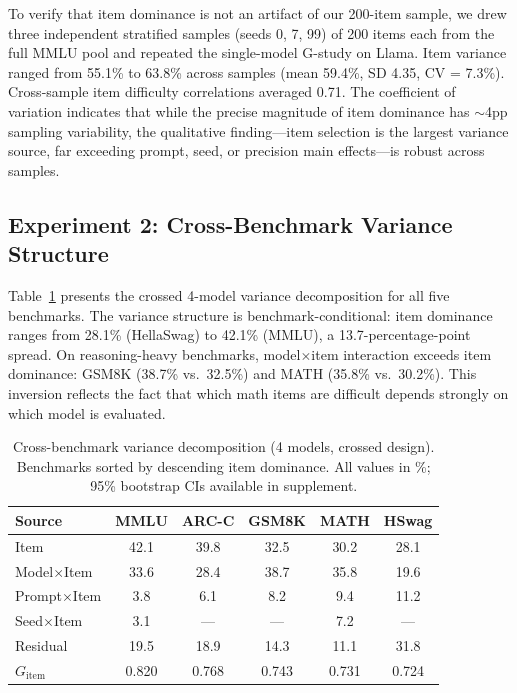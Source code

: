 \documentclass[11pt,letterpaper]{article}
\begin{document}
To verify that item dominance is not an artifact of our 200-item sample, we drew three independent stratified samples (seeds 0, 7, 99) of 200 items each from the full MMLU pool and repeated the single-model G-study on Llama. Item variance ranged from 55.1\% to 63.8\% across samples (mean 59.4\%, SD 4.35, CV = 7.3\%). Cross-sample item difficulty correlations averaged 0.71. The coefficient of variation indicates that while the precise magnitude of item dominance has $\sim$4pp sampling variability, the qualitative finding---item selection is the largest variance source, far exceeding prompt, seed, or precision main effects---is robust across samples.

\subsection{Experiment 2: Cross-Benchmark Variance Structure}
\label{sec:cross_bench}

Table~\ref{tab:cross_benchmark} presents the crossed 4-model variance decomposition for all five benchmarks. The variance structure is benchmark-conditional: item dominance ranges from 28.1\% (HellaSwag) to 42.1\% (MMLU), a 13.7-percentage-point spread. On reasoning-heavy benchmarks, model$\times$item interaction exceeds item dominance: GSM8K (38.7\% vs.\ 32.5\%) and MATH (35.8\% vs.\ 30.2\%). This inversion reflects the fact that which math items are difficult depends strongly on which model is evaluated.

\begin{table}[t]
\centering
\caption{Cross-benchmark variance decomposition (4 models, crossed design). Benchmarks sorted by descending item dominance. All values in \%; 95\% bootstrap CIs available in supplement.}
\label{tab:cross_benchmark}
\small
\begin{tabular}{l@{\hskip 6pt}c@{\hskip 6pt}c@{\hskip 6pt}c@{\hskip 6pt}c@{\hskip 6pt}c}
\toprule
\textbf{Source} & \textbf{MMLU} & \textbf{ARC-C} & \textbf{GSM8K} & \textbf{MATH} & \textbf{HSwag} \\
\midrule
Item         & 42.1 & 39.8 & 32.5 & 30.2 & 28.1 \\
Model$\times$Item & 33.6 & 28.4 & 38.7 & 35.8 & 19.6 \\
Prompt$\times$Item & 3.8 & 6.1 & 8.2 & 9.4 & 11.2 \\
Seed$\times$Item & 3.1 & --- & --- & 7.2 & --- \\
Residual     & 19.5 & 18.9 & 14.3 & 11.1 & 31.8 \\
\midrule
$G_{\text{item}}$ & 0.820 & 0.768 & 0.743 & 0.731 & 0.724 \\
\bottomrule
\end{tabular}
\end{table}
\end{document}
